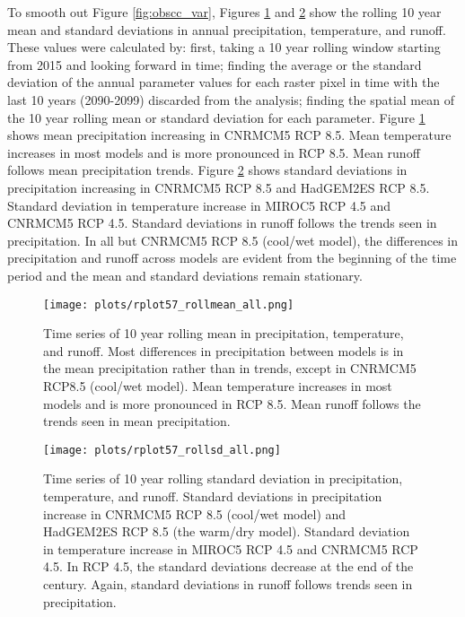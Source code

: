 To smooth out Figure \ref{fig:obscc_var}, Figures \ref{fig:rollmean_var} and \ref{fig:rollsd_var} show the rolling 10 year mean and standard deviations in annual precipitation, temperature, and runoff. These values were calculated by: first, taking a 10 year rolling window starting from 2015 and looking forward in time; finding the average or the standard deviation of the annual parameter values for each raster pixel in time with the last 10 years (2090-2099) discarded from the analysis; finding the spatial mean of the 10 year rolling mean or standard deviation for each parameter. Figure \ref{fig:rollmean_var} shows mean precipitation increasing in CNRMCM5 RCP 8.5. Mean temperature increases in most models and is more pronounced in RCP 8.5. Mean runoff follows mean precipitation trends. Figure \ref{fig:rollsd_var} shows standard deviations in precipitation increasing in CNRMCM5 RCP 8.5 and HadGEM2ES RCP 8.5. Standard deviation in temperature increase in MIROC5 RCP 4.5 and CNRMCM5 RCP 4.5. Standard deviations in runoff follows the trends seen in precipitation. In all but CNRMCM5 RCP 8.5 (cool/wet model), the differences in precipitation and runoff across models are evident from the beginning of the time period and the mean and standard deviations remain stationary. 

\begin{figure}
	\centering
	\texttt{[image: plots/rplot57\_rollmean\_all.png]}
	\caption[Time series of 10 year rolling mean in precipitation, temperature, and runoff.]{Time series of 10 year rolling mean in precipitation, temperature, and runoff. Most differences in precipitation between models is in the mean precipitation rather than in trends, except in CNRMCM5 RCP8.5 (cool/wet model). Mean temperature increases in most models and is more pronounced in RCP 8.5. Mean runoff follows the trends seen in mean precipitation.}
	\label{fig:rollmean_var}
\end{figure}

\begin{figure}
	\centering
	\texttt{[image: plots/rplot57\_rollsd\_all.png]}
	\caption[Time series of 10 year rolling standard deviation in precipitation, temperature, and runoff.]{Time series of 10 year rolling standard deviation in precipitation, temperature, and runoff. Standard deviations in precipitation increase in CNRMCM5 RCP 8.5 (cool/wet model) and HadGEM2ES RCP 8.5 (the warm/dry model). Standard deviation in temperature increase in MIROC5 RCP 4.5 and CNRMCM5 RCP 4.5. In RCP 4.5, the standard deviations decrease at the end of the century. Again, standard deviations in runoff follows trends seen in precipitation.}
	\label{fig:rollsd_var}
\end{figure}

